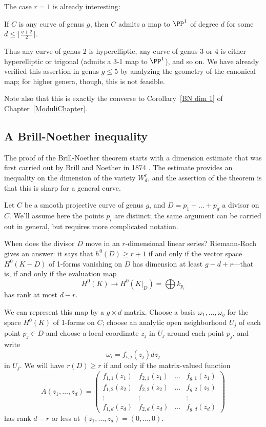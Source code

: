 The case $r=1$ is already interesting:

\begin{corollary}
If $C$ is any curve of genus $g$, then $C$ admits a map  to $\PP^1$ of degree $d$ for some $d \leq \lceil \frac{g+2}{2}\rceil$.
\end{corollary}

Thus any curve of genus 2 is hyperelliptic, any curve of genus 3 or 4 is either hyperelliptic or trigonal  (admits a 3-1 map to $\PP^1$), and so on. We have already verified this assertion in genus $g \leq 5$ by analyzing the geometry of the canonical map; for higher genera, though, this is not feasible.

Note also that this is exactly the converse to Corollary~\ref{BN dim 1} of Chapter~\ref{ModuliChapter}.


\subsection{A Brill-Noether inequality}

The proof of the Brill-Noether theorem starts with a dimension estimate that was first carried out by Brill and Noether in 1874 \cite{Brill-NoetherOriginal}. The estimate provides an inequality on the dimension
of the variety $W^r_d$, and the assertion of the theorem is that this is sharp for a general curve.


Let $C$ be a smooth projective curve of genus $g$, and $D = p_1 + \dots + p_d$ a divisor on $C$. We'll assume here the points $p_i$ are distinct; the same argument  can be carried out in general, but requires more complicated notation.

When does the divisor $D$ move in an $r$-dimensional linear series? Riemann-Roch gives an answer: it says that $h^0(D) \geq r+1$ if and only if the vector space $H^0(K-D)$ of 1-forms vanishing on $D$ has dimension at least $g-d+r$---that is, if and only if the  evaluation map
$$
H^0(K) \to H^0(K|_D) = \bigoplus k_{p_i}
$$
has rank at most $d-r$. 

We can represent this map by a $g \times d$ matrix. Choose a basis $\omega_1,\dots,\omega_g$ for the space $H^0(K)$ of 1-forms on $C$; choose an analytic open neighborhood $U_j$ of each point $p_j \in D$ and choose a local coordinate $z_j$ in $U_j$ around each point $p_j$, and write
$$
\omega_i = f_{i,j}(z_j)dz_j
$$
in $U_j$. We will have $r(D) \geq r$ if and only if the  matrix-valued function
$$
A(z_1,\dots,z_d) = 
\begin{pmatrix}
f_{1,1}(z_1) & f_{2,1}(z_1) & \dots & f_{g,1}(z_1) \\
f_{1,2}(z_2) & f_{2,2}(z_2) & \dots & f_{g,2}(z_2) \\
\vdots & \vdots &  & \vdots \\
f_{1,d}(z_d) & f_{2,d}(z_d) & \dots & f_{g,d} (z_d)
\end{pmatrix}
$$
has rank $d-r$ or less at $(z_1,\dots,z_d) = (0,\dots,0)$.

